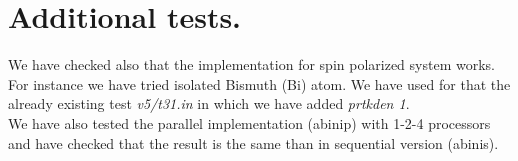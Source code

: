\documentclass[a4paper,12pt]{report}
\begin{document}
\section{Additional tests.}
We have checked also that the implementation for spin polarized system works. For instance we have tried isolated Bismuth (Bi) atom. We have used for that the already existing test \textit{v5/t31.in} in which we have added \textit{prtkden 1}.\\
We have also tested the parallel implementation (abinip) with 1-2-4 processors and have checked that the result is the same than in sequential version (abinis).
\end{document}
